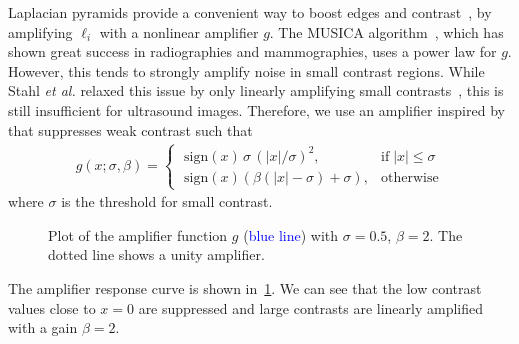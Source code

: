 Laplacian pyramids provide a convenient way to boost edges and contrast~\cite{vuylsteke_multiscale_1994, stahl_noiseresistant_1999, dippel_multiscale_2002}, by amplifying \({\boldsymbol\ell}_{i}\) with a nonlinear amplifier \(g\).
The MUSICA algorithm~\cite{vuylsteke_multiscale_1994}, which has shown great success in radiographies and mammographies, uses a power law for \(g\).
However, this tends to strongly amplify noise in small contrast regions.
While Stahl \textit{et al.} relaxed this issue by only linearly amplifying small contrasts~\cite{stahl_noiseresistant_1999}, this is still insufficient for ultrasound images.
Therefore, we use an amplifier inspired by~\cite{10.1145/2010324.1964963} that suppresses weak contrast such that
\begin{align}
  g\left(x; \sigma, \beta \right) =
  \begin{cases}
    \;\mathrm{sign}\left( x \right) \, \sigma \, {\left( |x|/\sigma \right)}^2, & \text{if}\; |x| \leq \sigma \\
    \;\mathrm{sign}\left( x \right) \left( \beta \left(|x| - \sigma \right) + \sigma \right), & \text{otherwise}
  \end{cases}
\end{align}
where \(\sigma\) is the threshold for small contrast.
%
\begin{figure}[H]
  \centering
  \caption{Plot of the amplifier function \(g\) (\textcolor{blue}{blue line}) with \(\sigma=0.5\), \(\beta=2\).
  The dotted line shows a unity amplifier.}\label{fig:amp}
\end{figure}
%
The amplifier response curve is shown in~\cref{fig:amp}.
We can see that the low contrast values close to \(x=0\) are suppressed and large contrasts are linearly amplified with a gain \(\beta=2\).

